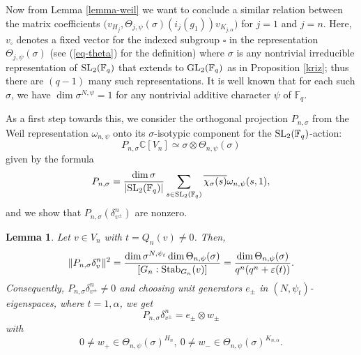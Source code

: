 \documentclass[12pt]{amsart}
\newtheorem{lemma}[theorem]{Lemma}%
\theoremstyle{definition}
\theoremstyle{remark}
\begin{document}
Now from Lemma \ref{lemma-weil} we want to conclude a similar relation between the matrix coefficients 
$\bigl(v_{H_j},\Theta_{j,\psi}(\sigma)(i_j(g_1))v_{K_{j,\alpha}}\bigr)$
for $j=1$ and $j=n$. Here, $v_\square$ denotes a fixed vector for the indexed subgroup $\square$ in the representation $\Theta_{j,\psi}(\sigma)$ (see (\ref{eq-theta}) for the definition) where $\sigma$ is any nontrivial irreducible representation of ${\rm SL}_2(\mathbb F_q)$ that extends to ${\rm GL}_2(\mathbb F_q)$ as in Proposition \ref{kriz}; thus there are $(q-1)$ many such representations. It is well known that for each such $\sigma$, we have $\dim \sigma^{N,\psi}=1$ for any nontrivial additive character $\psi$ of $\mathbb F_q$.

As a first step towards this, we consider the orthogonal projection $P_{n,\sigma}$ from the Weil representation $\omega_{n,\psi}$ onto its $\sigma$-isotypic component for the ${\rm SL}_2(\mathbb F_q)$-action:
\[
P_{n,\sigma}\mathbb C[V_n]
\simeq \sigma\otimes\Theta_{n,\psi}(\sigma) 
\]
given by the formula
\begin{equation}\label{proj}
P_{n,\sigma}
=\frac{\dim\sigma}{|{\rm SL}_2(\mathbb F_q)|}
\sum_{s\in {\rm SL}_2(\mathbb F_q)}
\overline{\chi_\sigma(s)} \omega_{n,\psi}(s,1),
\end{equation}
and we show that $P_{n,\sigma}(\delta^n_{v^\pm})$ are nonzero. 
\begin{lemma}\label{lemma-nonzero}
Let $v \in V_n$ with $t = Q_n(v) \neq 0$. Then,
\[
\|P_{n,\sigma}\delta_v^n\|^2
=
\frac{\dim\sigma^{N,\psi_t}
      \dim\Theta_{n,\psi}(\sigma)}
     {[G_n: {\rm Stab}_{G_n}(v)]}
=  \frac{\dim\Theta_{n,\psi}(\sigma)}
     {q^n(q^n+\varepsilon(t))}.
\]
Consequently, $P_{n,\sigma}\delta_{v^\pm}^n\neq0$ and choosing unit generators $e_\pm$ in $(N,\psi_t)$-eigenspaces, where $t=1,\alpha$, we get 
\[
P_{n,\sigma}\delta_{v^\pm}^n= e_\pm\otimes w_\pm
\]
with
\[
0 \neq w_+ \in\Theta_{n,\psi}(\sigma)^{H_n},~
0 \neq w_-\in\Theta_{n,\psi}(\sigma)^{K_{n,\alpha}}.
\]
\end{lemma}
\end{document}
